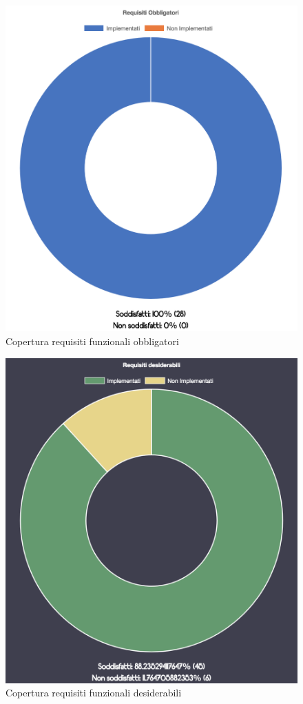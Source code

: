 \begin{figure}[H]
	\centering
	\includegraphics[scale = 0.2]{Images/obbligatori.png}
	\caption{Copertura requisiti funzionali obbligatori}
	\label{img:seqGraph}
\end{figure}
\begin{figure}[H]
	\centering
	\includegraphics[scale = 0.2]{Images/desiderabili.png}
	\caption{Copertura requisiti funzionali desiderabili}
	\label{img:seqGraph}
\end{figure}
